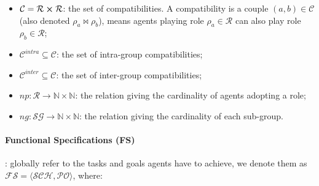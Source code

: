 \documentclass{ecai}
\newcounter{relation}
\begin{document}
\begin{itemize}
\begin{itemize}
              \item $\mathcal{C} = \mathcal{R} \cross \mathcal{R}$: the set of compatibilities. A compatibility is a couple $(a,b) \in \mathcal{C}$ (also denoted $\rho_a \bowtie \rho_b$), means agents playing role $\rho_a \in \mathcal{R}$ can also play role $\rho_b \in \mathcal{R}$;
              \item $\mathcal{C}^{intra} \subseteq \mathcal{C}$: the set of intra-group compatibilities;
              \item $\mathcal{C}^{inter} \subseteq \mathcal{C}$: the set of inter-group compatibilities;

              \item $np: \mathcal{R} \rightarrow \mathbb{N} \times \mathbb{N}$: the relation giving the cardinality of agents adopting a role;
              \item $ng: \mathcal{SG} \rightarrow \mathbb{N} \times \mathbb{N}$: the relation giving the cardinality of each sub-group.

          \end{itemize}

\end{itemize}

\paragraph{\textbf{Functional Specifications (FS)}}: globally refer to the tasks and goals agents have to achieve, we denote them as $\mathcal{FS} = \langle \mathcal{SCH}, \mathcal{PO} \rangle$, where:
\end{document}

